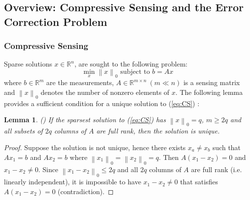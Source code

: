 \documentclass[journal]{IEEEtran}
\newcommand{\norm}[1]{\left\lVert#1\right\rVert}
\newtheorem{lem}{\bf{Lemma}}
\begin{document}
\subsection{Overview: Compressive Sensing and the Error Correction Problem \cite{Candes_Tao}} 

\subsubsection{Compressive Sensing}
Sparse solutions $x\in \mathbb{R}^n$, are sought to the following problem:
\begin{equation}
	\min_x \norm{x}_0 \text{ subject to } b= Ax
	\label{eq:CS}
\end{equation}
where $b \in \mathbb{R}^m$ are the measurements, $A \in \mathbb{R}^{m\times n}~ (m \ll n)$ is a sensing matrix and $\norm{x}_0$ denotes the number of nonzero elements of $x$. The following lemma provides a sufficient condition for a unique solution to (\ref{eq:CS}) \cite{Candes_Tao}:

\begin{lem} \emph{(\hspace{1sp}\cite{David_Chang})} \label{lem:CS}
If the sparsest solution to (\ref{eq:CS}) has $\norm{x}_0 = q$, $m\ge 2q$ and all subsets of $2q$ columns of $A$ are full rank, then the solution is unique. 
\end{lem}
\begin{proof}
Suppose the solution is not unique, hence there exists $x_a \neq  x_b$ such that $Ax _1 = b$ and $Ax_2 = b$ where $\norm{x_1}_0 = \norm{x_2}_0 = q$. Then $A(x_1 - x_2) = 0$ and $x_1 - x_2 \neq 0$. Since $\norm{x_1-x_2}_0 \leq 2q$ and all $2q$ columns of $A$ are full rank (i.e. linearly independent), it is impossible to have $x_1-x_2\neq 0$ that satisfies $A(x_1-x_2) = 0$ (contradiction).
\end{proof}
\end{document}
